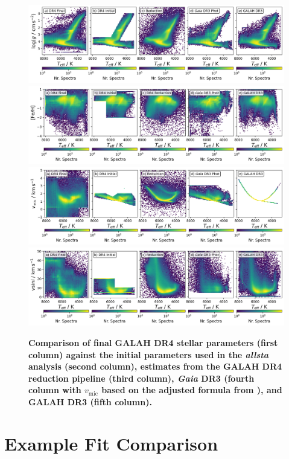 \documentclass[
  journal=pasa,
  manuscript=research-paper, %
  year=2023,
  volume=37
]{cup-journal}
\newcommand{\vmic}{$v_\mathrm{mic}$\xspace}
\newcommand{\Gaia}{\textit{Gaia}\xspace}
\begin{document}
\begin{figure}[ht]
 \centering
 \includegraphics[width=\textwidth]{figures/initial_teff_logg.png}
 \includegraphics[width=\textwidth]{figures/initial_teff_fe_h.png}
 \includegraphics[width=\textwidth]{figures/initial_teff_vmic.png}
 \includegraphics[width=\textwidth]{figures/initial_teff_vsini.png} \caption{\textbf{Comparison of final GALAH DR4 stellar parameters (first column) against the initial parameters used in the \textit{allsta} analysis (second column), estimates from the GALAH DR4 reduction pipeline (third column), \Gaia DR3 (fourth column with \vmic based on the adjusted formula from \citet{DutraFerreira2016}), and GALAH DR3 (fifth column).}} \label{fig:initial_parameters}
\end{figure}

\section{Example Fit Comparison}
\end{document}
